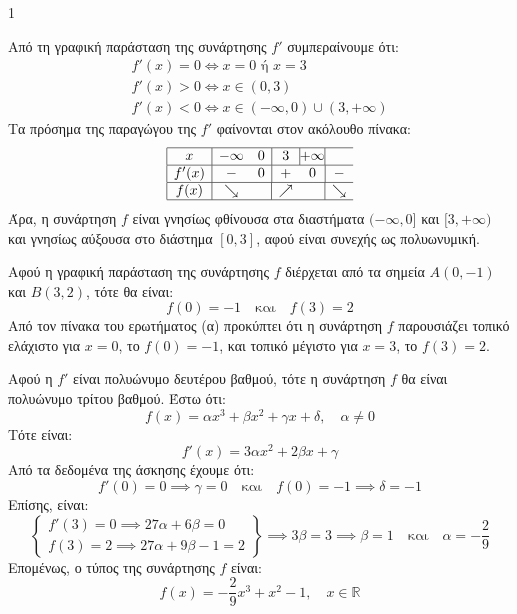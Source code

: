 \begin{ylh}{1}
    \item [Διαφορικός Λογισμός]
\end{ylh}
\begin{alist}
    \item Από τη γραφική παράσταση της συνάρτησης $f'$ συμπεραίνουμε ότι:
    \[
    \begin{gathered}
    f'(x) = 0 \iff x = 0 \text{ ή } x = 3 \\
    f'(x) > 0 \iff x \in (0,3) \\
    f'(x) < 0 \iff x \in (-\infty,0) \cup (3,+\infty)
    \end{gathered}
    \]
    Τα πρόσημα της παραγώγου της $f'$ φαίνονται στον ακόλουθο πίνακα:
    \[
    \begin{array}{|c|c*{2}{c@{\vline}c@{\vline}}c|}
    \hline
    x & -\infty & \multicolumn{1}{c|}{0} & \multicolumn{1}{c|}{3} & +\infty \\
    \hline
    f'(x) & \multicolumn{1}{c}{-} & \multicolumn{1}{c|}{0} & \multicolumn{1}{c}{+} & \multicolumn{1}{c|}{0} & \multicolumn{1}{c}{-} \\
    \hline
    f(x) & \multicolumn{1}{c}{\searrow} & & \multicolumn{1}{c}{\nearrow} & & \multicolumn{1}{c}{\searrow} \\
    \hline
    \end{array}
    \]
    Άρα, η συνάρτηση $f$ είναι γνησίως φθίνουσα στα διαστήματα $(-\infty,0]$ και $[3,+\infty)$ και γνησίως αύξουσα στο διάστημα $[0,3]$, αφού είναι συνεχής ως πολυωνυμική. 

    \item Αφού η γραφική παράσταση της συνάρτησης $f$ διέρχεται από τα σημεία $A(0,-1)$ και $B(3,2)$, τότε θα είναι:
    \[
    f(0) = -1 \quad \text{και} \quad f(3) = 2
    \]
    Από τον πίνακα του ερωτήματος (α) προκύπτει ότι η συνάρτηση $f$ παρουσιάζει τοπικό ελάχιστο για $x=0$, το $f(0)=-1$, και τοπικό μέγιστο για $x=3$, το $f(3)=2$. 

    \item Αφού η $f'$ είναι πολυώνυμο δευτέρου βαθμού, τότε η συνάρτηση $f$ θα είναι πολυώνυμο τρίτου βαθμού. Έστω ότι:
    \[
    f(x) = \alpha x^3 + \beta x^2 + \gamma x + \delta, \quad \alpha \ne 0
    \]
    Τότε είναι:
    \[
    f'(x) = 3\alpha x^2 + 2\beta x + \gamma
    \]
    Από τα δεδομένα της άσκησης έχουμε ότι:
    \[
    f'(0) = 0 \implies \gamma = 0 \quad \text{και} \quad f(0) = -1 \implies \delta = -1
    \]
    Επίσης, είναι:
    \[
    \left\{
    \begin{array}{l}
    f'(3) = 0 \implies 27\alpha + 6\beta = 0 \\
    f(3) = 2 \implies 27\alpha + 9\beta - 1 = 2
    \end{array}
    \right\}
    \implies 3\beta = 3 \implies \beta = 1 \quad \text{και} \quad \alpha = -\frac{2}{9}
    \]
    Επομένως, ο τύπος της συνάρτησης $f$ είναι:
    \[
    f(x) = -\frac{2}{9}x^3 + x^2 - 1, \quad x \in \mathbb{R}
    \] 


\end{alist}
